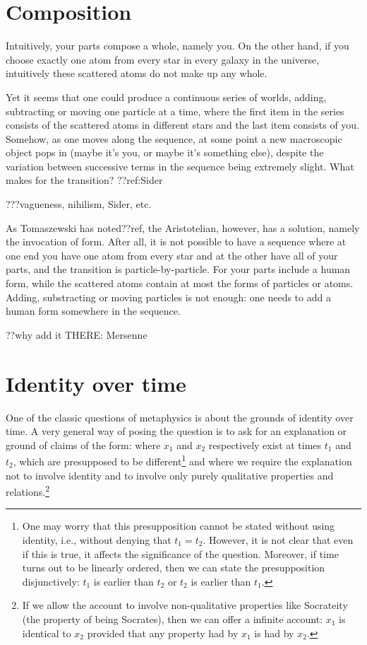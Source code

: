 \section{Composition}
Intuitively, your parts compose a whole, namely you. On the other hand,
if you choose exactly one atom from every star in every galaxy in the universe,
intuitively these scattered atoms do not make up any whole.

Yet it seems that one could produce a continuous series of worlds, adding, subtracting or moving 
one particle at a time, where the first item in the series consists of the scattered
atoms in different stars and the last item consists of you. Somehow, as one moves
along the sequence, at some point a new macroscopic object pops in (maybe it's 
you, or maybe it's something else), despite the variation between successive terms
in the sequence being extremely slight. What makes for the transition? ??ref:Sider

???vagueness, nihilism, Sider, etc.

As Tomaszewski has noted??ref, the Aristotelian, however, has a solution, namely
the invocation of form. After all, it is not possible to have a sequence where at
one end you have one atom from every star and at the other have all of your parts,
and the transition is particle-by-particle. For your parts include a human form,
while the scattered atoms contain at most the forms of particles or atoms. Adding,
substracting or moving particles is not enough: one needs to add a human form
somewhere in the sequence.

??why add it THERE: Mersenne

\section{Identity over time}
One of the classic questions of metaphysics is about the grounds of identity over time. 
A very general way of posing the question is to ask for an explanation or ground of claims
of the form:
where $x_1$ and $x_2$ respectively exist at times $t_1$ and $t_2$, which are presupposed to be different\footnote{One may worry that this
presupposition cannot be stated without using identity, i.e., without denying that
$t_1=t_2$. However, it is not clear that even if this is true, it affects the
significance of the question. Moreover, if time turns out to be linearly ordered,
then we can state the presupposition disjunctively: $t_1$ is earlier than $t_2$ 
or $t_2$ is earlier than $t_1$.} and where we require the explanation not to
involve identity and to involve only purely qualitative properties and 
relations.\footnote{If we allow the account to involve non-qualitative properties 
like Socrateity (the property of being Socrates), then we can offer a infinite 
account: $x_1$ is identical to $x_2$ provided that any property had by $x_1$ is 
had by $x_2$.}

